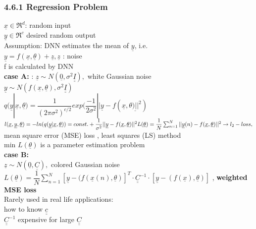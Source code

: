 \subsubsection{4.6.1 Regression Problem}
$ \underline{x} \in \Re^d $: random input \\
$ \underline{y} \in \Re^c $ desired random output \\
Assumption: DNN estimates the mean of $ \underline{y} $, i.e. \\
$  \underline{y} = f(\underline{x} , \underline{\theta})  + \underline{z} , \underline{z}$ : noise \\
f is calculated by DNN \\
\textbf{case A: } : $  \underline{z} \sim N(\underline{0} , \sigma^2 \underline{\underline{I}}),$ white Gaussian noise\\
$ \underline{y} \sim N(f(\underline{x}, \underline{\theta}), \sigma^2 \underline{\underline{I}}  ) $\\
$ q (\underline{y} | \underline{x} , \underline{\theta}) = \dfrac{1}{(2 \pi \sigma^2)^{c/2}}  exp ( \dfrac{-1}{2 \sigma^2} || \underline{y} - f(\underline{x}, \underline{\theta) ||^2})$ \\
$ l(\underline{x}, \underline{y} , \underline{\theta})  = -ln (q(\underline{y}| \underline{x} , \underline{\theta})) = const.+ \dfrac{1}{\sigma^2} || \underline{y} - f(\underline{x} , \underline{\theta}) ||^2\\
L(\underline{\theta}) = \dfrac{1}{N} \sum_{n=1}^{N} || \underline{y}(n) - f(\underline{x} , \underline{\theta}) ||^2 \\
 \rightarrow l_2- loss, $ mean square error (MSE) loss , least squares (LS) method \\
 min $ L(\underline{\theta}) $ is a parameter estimation problem \\
\textbf{ case B:} \\
$ \underline{z} \sim N(\underline{0} , \underline{\underline{C}}) ,  $ colored Gaussian noise \\
$ L(\underline{\theta})  = \dfrac{1}{N} \sum_{n=1}^{N} [\underline{y} - (f(\underline{x}(n) , \underline{\theta})]^T \cdot \underline{\underline{C}}^{-1} \cdot [\underline{y} - (f(\underline{x}) , \underline{\theta})] $ , \textbf{weighted MSE loss}\\
Rarely used in real life applications: \\
\textbullet how to know $ \underline{\underline{c}} $ \\
\textbullet $ \underline{\underline{C}}^{-1} $ expensive for large $ \underline{\underline{C}} $ \\
